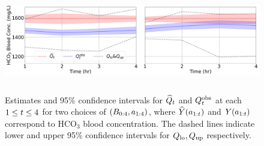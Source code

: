 \begin{figure}%
    \centering
    \includegraphics[height=4.5cm]{figures/causal/longitudinal_plots/HCO3_hyp_38v37_longitudinal_nogray.pdf}
    \caption{Estimates and 95\% confidence intervals for $\widehat{Q}_t$ and $Q^{\textup{obs}}_t$ at each $1\leq t \leq 4$ for two choices of $(B_{0:4}, a_{1:4})$, where $\widehat{Y}(a_{1:t})$ and $Y(a_{1:t})$ correspond to HCO$_3$ blood concentration.
    The dashed lines indicate lower and upper 95\% confidence intervals for $Q_{\mathrm{lo}}, Q_{\mathrm{up}}$ respectively.  }
    \label{fig:longitudinal_plots}
\end{figure}

